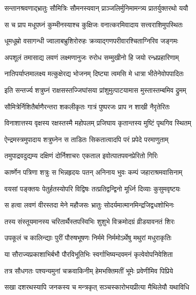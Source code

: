 \twolineshloka
{सन्तानश्रवणाद्भ्रातुः सौमित्रिः सौमनस्यवान्}
{प्राञ्जलिर्मुनिमामन्त्र्य प्रातर्युक्तरथो ययौ} %

\twolineshloka
{स च प्राप मधूपघ्नं कुम्भीनस्याश्च कुक्षिजः}
{वनात्करमिवादाय सत्त्वराशिमुपस्थितः} %

\twolineshloka
{धूमधूम्रो वसागन्धी ज्वालाबभ्रुशिरोरुहः}
{क्रव्याद्गणपरीवारश्चिताग्निरिव जङ्गमः} %

\twolineshloka
{अपशूलं तमासाद्य लवणं लक्ष्मणानुजः}
{रुरोध सम्मुखीनो हि जयो रन्ध्रप्रहारिणाम्} %

\twolineshloka
{नातिपर्याप्तमालक्ष्य मत्कुक्षेरद्य भोजनम्}
{दिष्ट्या त्वमसि मे धात्रा भीतेनेवोपपादितः} %

\twolineshloka
{इति सन्तर्ज्य शत्रुघ्नं राक्षसस्तज्जिघांसया}
{प्रांशुमुत्पाटयामास मुस्तास्तम्बमिव द्रुमम्} %

\twolineshloka
{सौमित्रेर्निशितैर्बाणैरन्तरा शकलीकृतः}
{गात्रं पुष्परजः प्राप न शाखी नैरृतेरितः} %

\twolineshloka
{विनाशात्तस्य वृक्षस्य रक्षस्तस्मै महोपलम्}
{प्रजिघाय कृतान्तस्य मुष्टिं पृथगिव स्थितम्} %

\twolineshloka
{ऐन्द्रमस्त्रमुपादाय शत्रुघ्नेन स ताडितः}
{सिकतात्वादपि परं प्रपेदे परमाणुताम्} %

\twolineshloka
{तमुपाद्रवदुद्यम्य दक्षिणं दोर्निशाचरः}
{एकताल इवोत्पातपवनप्रेरितो गिरिः} %

\twolineshloka
{कार्ष्णेन पत्रिणा शत्रुः स भिन्नहृदयः पतन्}
{अनिनाय भुवः कम्पं जहाराश्रमवासिनाम्} %

\twolineshloka
{वयसां पङ्क्तयः पेतुर्हतस्योपरि विद्विषः}
{तत्प्रतिद्वन्द्विनो मूर्ध्नि दिव्याः कुसुमवृष्टयः} %

\twolineshloka
{स हत्वा लवणं वीरस्तदा मेने महौजसः}
{भ्रातुः सोदर्यमात्मानमिन्द्रजिद्वधशोभिनः} %

\twolineshloka
{तस्य संस्तूयमानस्य चरितार्थैस्तपस्विभिः}
{शुशुभे विक्रमोदग्रं व्रीडयावनतं शिरः} %

\twolineshloka
{उपकूलं च कालिन्द्याः पुरीं पौरुषभूषणः}
{निर्ममे निर्ममोऽर्थेषु मथुरां मधुराकृतिः} %

\twolineshloka
{या सौराज्यप्रकाशाभिर्बभौ पौरविभूतिभिः}
{स्वर्गाभिष्यन्दवमनं कृत्वेवोपनिवेशिता} %

\twolineshloka
{तत्र सौधगतः पश्यन्यमुनां चक्रवाकिनीम्}
{हेमभक्तिमतीं भूमेः प्रवेणीमिव पिप्रिये} %

\twolineshloka
{सखा दशरथस्यापि जनकस्य च मन्त्रकृत्}
{सञ्चस्कारोभयप्रीत्या मैथिलेयौ यथाविधि} %

